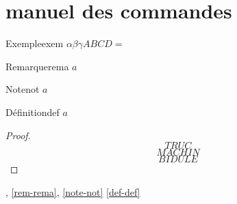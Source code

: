 \documentclass[a4paper,french]{memoir}
\begin{document}
\chapter{manuel des commandes}
\begin{theoremb}{Exemple}{exem}
\(\alpha\beta\gamma ABCD=\)
\end{theoremb}
\begin{remarkb}{Remarque}{rema}
\(a\)
\end{remarkb}
\begin{noteb}{Note}{not}
$a$
\end{noteb}
\begin{defb}{Définition}{def}
$a$
\end{defb}
\begin{proof}
\makeatletter
{}
\[TRUC\]
\proofpart{}
\[MACHIN\]
\[BIDULE\]
\end{proof}
, \cref{rem-rema}, \cref{note-not} \cref{def-def} 
\end{document}
